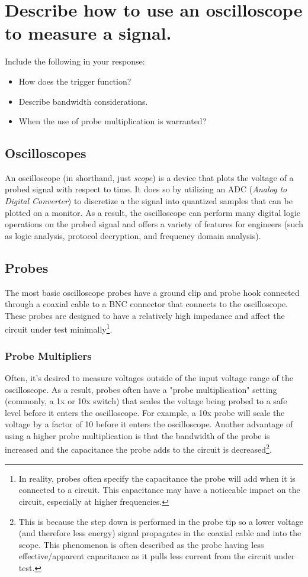 \documentclass[main.tex]{subfiles}
\begin{document}
\section{Describe how to use an oscilloscope to measure a signal.}

Include the following in your response:
\begin {itemize}
    \item How does the trigger function?
    \item Describe bandwidth considerations.
    \item When the use of probe multiplication is warranted?
\end {itemize}

\spoilerline

\subsection{Oscilloscopes}
An oscilloscope (in shorthand, just \textit{scope}) is a device that plots the voltage of a probed signal with respect to time. It does so by utilizing an ADC (\textit{Analog to Digital Converter}) to discretize a the signal into quantized samples that can be plotted on a monitor. As a result, the oscilloscope can perform many digital logic operations on the probed signal and offers a variety of features for engineers (such as logic analysis, protocol decryption, and frequency domain analysis).

\subsection{Probes}
The most basic oscilloscope probes have a ground clip and probe hook connected through a coaxial cable to a BNC connector that connects to the oscilloscope. These probes are designed to have a relatively high impedance and affect the circuit under test minimally\footnote{In reality, probes often specify the capacitance the probe will add when it is connected to a circuit. This capacitance may have a noticeable impact on the circuit, especially at higher frequencies.}. \newline

\subsubsection{Probe Multipliers}
\newnoindentpara Often, it's desired to measure voltages outside of the input voltage range of the oscilloscope. As a result, probes often have a "probe multiplication" setting (commonly, a 1x or 10x switch) that scales the voltage being probed to a safe level before it enters the oscilloscope. For example, a 10x probe will scale the voltage by a factor of 10 before it enters the oscilloscope. Another advantage of using a higher probe multiplication is that the bandwidth of the probe is increased and the capacitance the probe adds to the circuit is decreased\footnote{This is because the step down is performed in the probe tip so a lower voltage (and therefore less energy) signal propagates in the coaxial cable and into the scope. This phenomenon is often described as the probe having less effective/apparent capacitance as it pulls less current from the circuit under test.}.
\end{document}
